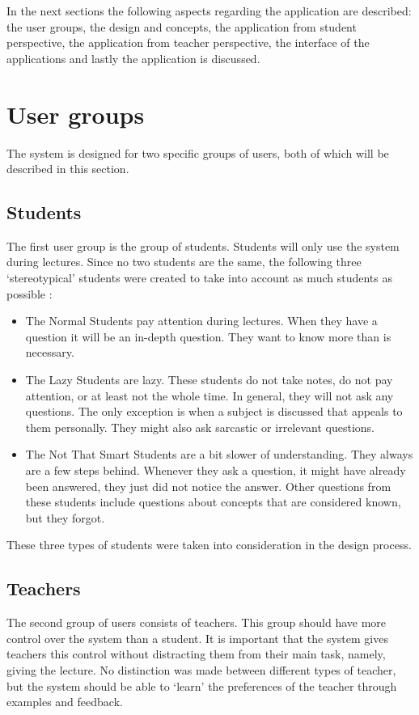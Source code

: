 \documentclass[11pt]{article}
\begin{document}
In the next sections the following aspects regarding the application are described: the user groups, the design and concepts, the application from student perspective, the application from teacher perspective, the interface of the applications and lastly the application is discussed. 

\section{User groups}
The system is designed for two specific groups of users, both of which will be described in this section.
\subsection{Students}
The first user group is the group of students. Students will only use the system during lectures. 
Since no two students are the same, the following three `stereotypical' students were created to take into account as much students as possible :
\begin{itemize}
\item The Normal Students pay attention during lectures. When they have a question it will be an in-depth question. They want to know more than is necessary.
\item The Lazy Students are lazy. These students do not take notes, do not pay attention, or at least not the whole time. In general, they will not ask any questions. The only exception is when a subject is discussed that appeals to them personally. They might also ask sarcastic or irrelevant questions.
\item The Not That Smart Students are a bit slower of understanding. They always are a few steps behind. Whenever they ask a question, it might have already been answered, they just did not notice the answer. Other questions from these students include questions about concepts that are considered known, but they forgot.
\end{itemize}

These three types of students were taken into consideration in the design process.

\subsection{Teachers}
The second group of users consists of teachers. This group should have more control over the system than a student. It is important that the system gives teachers this control without distracting them from their main task, namely, giving the lecture. No distinction was made between different types of teacher, but the system should be able to `learn' the preferences of the teacher through examples and feedback.  
\end{document}
